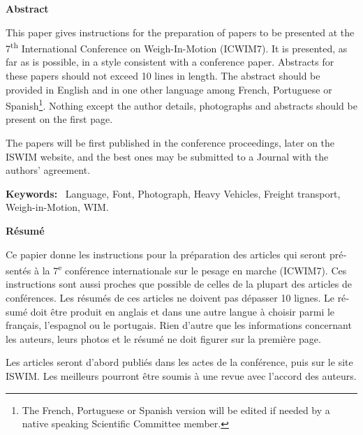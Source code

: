 \documentclass[a4paper]{article}
\newcommand\textstyletablecaptionCar[1]{\foreignlanguage{english}{\textbf{#1}}}
\begin{document}
\bigskip


\bigskip

{\bfseries
Abstract}

{
This paper gives instructions for the preparation of papers to be
presented at the 7\textsuperscript{th} International Conference on
Weigh-In-Motion (ICWIM7). It is presented, as far as is possible, in a
style consistent with a conference paper. Abstracts for these papers
should not exceed 10 lines in length. The abstract should be provided
in English and in one other language among French, Portuguese or
Spanish\footnote{ The French, Portuguese or Spanish version will be
edited if needed by a native speaking Scientific Committee member.}.
Nothing except the author details, photographs and abstracts should be
present on the first page.}


\bigskip

{
The papers will be first published in the conference proceedings, later
on the ISWIM website, and the best ones may be submitted to a Journal
with the authors’ agreement.}


\bigskip

{
\textstyletablecaptionCar{Keywords:} \ Language, Font, Photograph, Heavy
Vehicles, Freight transport, Weigh-in-Motion, WIM.}


\bigskip

{\bfseries
\foreignlanguage{french}{Résumé}}

{
\foreignlanguage{french}{Ce papier donne les instructions pour la
préparation des articles qui seront présentés à la
7}\foreignlanguage{french}{\textsuperscript{e}}\foreignlanguage{french}{
conférence internationale sur le pesage en marche (ICWIM7). Ces
instructions sont aussi proches que possible de celles de la plupart
des articles de conférences. Les résumés de ces articles ne doivent pas
dépasser 10 lignes. Le résumé doit être produit en anglais et dans une
autre langue à choisir parmi le français, l’espagnol ou le portugais.
Rien d’autre que les informations concernant les auteurs, leurs photos
et le résumé ne doit figurer sur la première page.}}


\bigskip

{
\foreignlanguage{french}{Les articles seront d’abord publiés dans les
actes de la conférence, puis sur le site ISWIM. Les meilleurs pourront
être soumis à une revue avec l’accord des auteurs.}}
\end{document}
